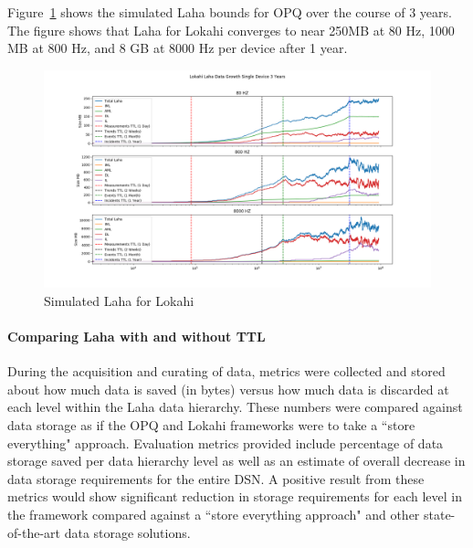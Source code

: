 Figure~\ref{fig:sim_laha_lokahi} shows the simulated Laha bounds for OPQ over the course of 3 years. The figure shows that Laha for Lokahi converges to near 250MB at 80 Hz, 1000 MB at 800 Hz, and 8 GB at 8000 Hz per device after 1 year.

\begin{figure}[H]
	\centering
	\includegraphics[width=\linewidth]{figures/sim_laha_lokahi.png}
	\caption{Simulated Laha for Lokahi}
	\label{fig:sim_laha_lokahi}
\end{figure}


\paragraph{Comparing Laha with and without TTL}

During the acquisition and curating of data, metrics were collected and stored about how much data is saved (in bytes) versus how much data is discarded at each level within the Laha data hierarchy. These numbers were compared against data storage as if the OPQ and Lokahi frameworks were to take a ``store everything" approach. Evaluation metrics provided include percentage of data storage saved per data hierarchy level as well as an estimate of overall decrease in data storage requirements for the entire DSN. A positive result from these metrics would show significant reduction in storage requirements for each level in the framework compared against a ``store everything approach" and other state-of-the-art data storage solutions.

